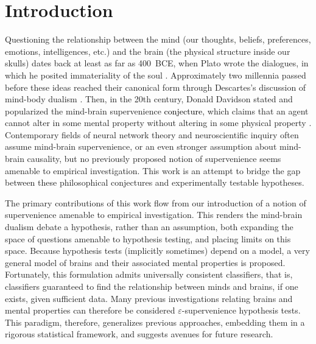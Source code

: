 \documentclass{article}
\newcommand{\eps}{\varepsilon}
\providecommand{\tr}[1]{\textcolor{black}{#1}}
\begin{document}


\section{Introduction}

Questioning the relationship between the mind (our thoughts, beliefs, preferences, emotions, intelligences, etc.) and the brain (the physical structure inside our skulls) dates back at least as far as 400~BCE, when Plato wrote the dialogues, in which he posited immateriality of the soul \cite{Plato97}. Approximately two millennia passed before these ideas reached their canonical form through Descartes's discussion of mind-body dualism \cite{Descartes1641}. Then, in the 20th century, Donald Davidson stated and popularized the mind-brain supervenience \tr{conjecture}, which claims that an agent cannot alter in some mental property without altering in some physical property \cite{Davidson70}. Contemporary fields of neural network theory and neuroscientific inquiry often assume mind-brain supervenience, or an even stronger assumption about mind-brain causality, but no previously proposed notion of supervenience seems amenable to empirical investigation. This work is an attempt to bridge the gap between these philosophical conjectures and experimentally testable hypotheses. %

The primary contributions of this work flow from our introduction of a notion of supervenience amenable to empirical investigation.  This renders the mind-brain dualism debate a hypothesis, rather than an assumption, both expanding the space of questions amenable to hypothesis testing, and placing limits on this space.  Because hypothesis tests (implicitly sometimes) depend on a model, a very general model of brains and their associated mental properties is proposed.  Fortunately, this formulation admits universally consistent classifiers, that is, classifiers guaranteed to find the relationship between minds and brains, if one exists, given sufficient data.  Many previous investigations relating brains and mental properties can therefore be considered $\eps$-supervenience hypothesis tests.  This paradigm, therefore, generalizes previous approaches, embedding them in a rigorous statistical framework, and suggests avenues for future research.
\end{document}
